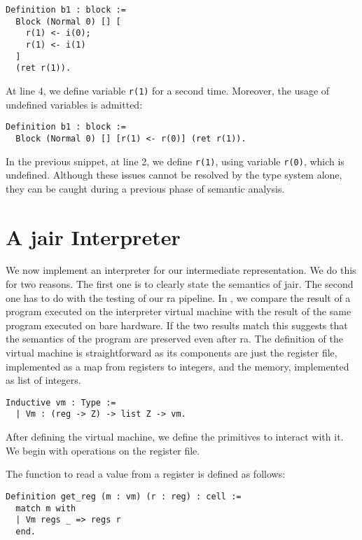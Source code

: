 \begin{lstlisting}[style=Rocq]
Definition b1 : block :=
  Block (Normal 0) [] [
    r(1) <- i(0);
    r(1) <- i(1)
  ]
  (ret r(1)).
\end{lstlisting}

At line 4, we define variable \texttt{r(1)} for a second time.
Moreover, the usage of undefined variables is admitted:

\begin{lstlisting}[style=Rocq]
Definition b1 : block :=
  Block (Normal 0) [] [r(1) <- r(0)] (ret r(1)).
\end{lstlisting}

In the previous snippet, at line 2, we define \texttt{r(1)}, using variable \texttt{r(0)}, which is undefined.
Although these issues cannot be resolved by the type system alone, they can be caught during a previous phase of semantic analysis.

\section{A \gls{jair} Interpreter}
\label{sec:jair-vm}

We now implement an interpreter for our intermediate representation. We do this for two reasons. The first one is to clearly state the semantics of \gls{jair}. The second one has to do with the testing of our \gls{ra} pipeline. In , we compare the result of a program executed on the interpreter virtual machine with the result of the same program executed on bare hardware. If the two results match this suggests that the semantics of the program are preserved even after \gls{ra}.
The definition of the virtual machine is straightforward as its components are just the register file, implemented as a map from registers to integers, and the memory, implemented as list of integers.

\begin{lstlisting}[style=Rocq]
Inductive vm : Type :=
  | Vm : (reg -> Z) -> list Z -> vm.
\end{lstlisting}

After defining the virtual machine, we define the primitives to interact with it. We begin with operations on the register file.

The function to read a value from a register is defined as follows:

\begin{lstlisting}[style=Rocq]
Definition get_reg (m : vm) (r : reg) : cell :=
  match m with
  | Vm regs _ => regs r
  end.
\end{lstlisting}

